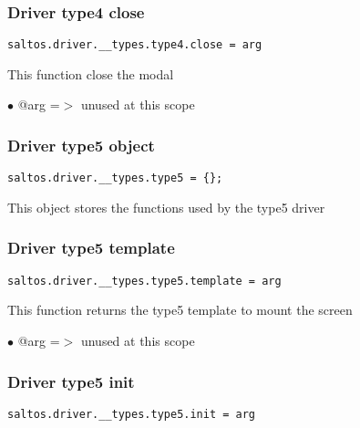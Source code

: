 \documentclass[a4paper]{article}
\begin{document}
\hypertarget{toc758}{}
\subsubsection{Driver type4 close}

\begin{lstlisting}
saltos.driver.__types.type4.close = arg
\end{lstlisting}

This function close the modal

\begin{compactitem}
\item[\color{myblue}$\bullet$] @arg =$>$ unused at this scope
\end{compactitem}

\hypertarget{toc759}{}
\subsubsection{Driver type5 object}

\begin{lstlisting}
saltos.driver.__types.type5 = {};
\end{lstlisting}

This object stores the functions used by the type5 driver

\hypertarget{toc760}{}
\subsubsection{Driver type5 template}

\begin{lstlisting}
saltos.driver.__types.type5.template = arg
\end{lstlisting}

This function returns the type5 template to mount the screen

\begin{compactitem}
\item[\color{myblue}$\bullet$] @arg =$>$ unused at this scope
\end{compactitem}

\hypertarget{toc761}{}
\subsubsection{Driver type5 init}

\begin{lstlisting}
saltos.driver.__types.type5.init = arg
\end{lstlisting}
\end{document}
